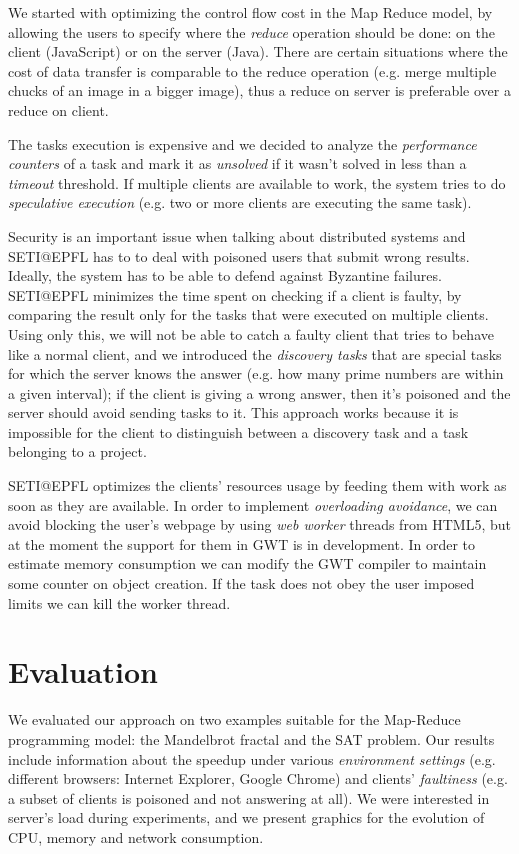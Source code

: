 \documentclass[letterpaper,twocolumn,10pt]{article}
\begin{document}
We started with optimizing the control flow cost in the Map Reduce model, by
allowing the users to specify where the \textit{reduce} operation should be
done: on the client (JavaScript) or on the server (Java). There are certain
situations where the cost of data transfer is comparable to the reduce operation
(e.g. merge multiple chucks of an image in a bigger image), thus a reduce on
server is preferable over a reduce on client.

The tasks execution is expensive and we decided to analyze the
\textit{performance counters} of a task and mark it as \textit{unsolved} if it
wasn't solved in less than a \textit{timeout} threshold. If multiple clients are
available to work, the system tries to do \textit{speculative execution} (e.g.
two or more clients are executing the same task).

Security is an important issue when talking about distributed systems and
SETI@EPFL has to to deal with poisoned users that submit wrong results. Ideally,
the system has to be able to defend against Byzantine failures\cite{byzantine}.
SETI@EPFL minimizes the time spent on checking if a client is faulty, by
comparing the result only for the tasks that were executed on multiple clients.
Using only this, we will not be able to catch a faulty client that tries to
behave like a normal client, and we introduced the \textit{discovery tasks} that
are special tasks for which the server knows the answer (e.g. how many prime
numbers are within a given interval); if the client is giving a wrong answer,
then it's poisoned and the server should avoid sending tasks to it. This
approach works because it is impossible for the client to distinguish between a
discovery task and a task belonging to a project.

SETI@EPFL optimizes the clients' resources usage by feeding them with work as
soon as they are available. In order to implement \textit{overloading
avoidance}, we can avoid blocking the user's webpage by using {\it web
worker} threads from HTML5, but at the moment the support for them in GWT is in
development. In order to estimate memory consumption we can modify the GWT 
compiler to maintain some counter on object creation. If the task does not obey
the user imposed limits we can kill the worker thread.

\section{Evaluation}
\label{eval}

We evaluated our approach on two examples suitable for the Map-Reduce
programming model: the Mandelbrot\cite{mandelbrot} fractal and the SAT\cite{sat}
problem. Our results include information about the speedup under various
\textit{environment settings} (e.g. different browsers: Internet Explorer, Google
Chrome) and clients' \textit{faultiness} (e.g. a subset of clients is poisoned
and not answering at all). We were interested in server's load during
experiments, and we present graphics for the evolution of CPU, memory and
network consumption.
\end{document}
